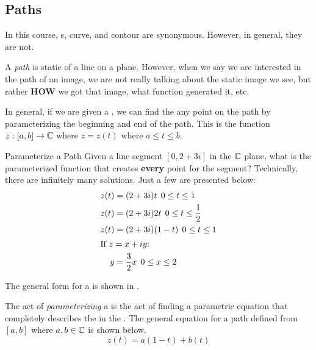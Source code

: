 \subsection{Paths}\label{subsec:Paths}
In this course, s, curve, and contour are synonymous.
However, in general, they are not.

\begin{definition}[Path]\label{def:Path}
  A \emph{path} is static  of a line on a plane.
  However, when we say we are interested in the path of an image, we are not really talking about the static image we see, but rather \textbf{HOW} we got that image, what function generated it, etc.
\end{definition}

In general, if we are given a , we can find the any point on the path by parameterizing the beginning and end of the path.
This is the function $z: [a, b] \to \operatorname{\mathbb{C}}$ where $z = z(t)$ where $a \leq t \leq b$.

\begin{example}{Parameterize a Path}
  Given a line segment $[0, 2+3i]$ in the $\operatorname{\mathbb{C}}$ plane, what is the parameterized function that creates \textbf{every} point for the segment?
  \tcblower{}
  Technically, there are infinitely many solutions.
  Just a few are presented below:
  \begin{align*}
    z(t) &= (2 + 3i)t \:\: 0 \leq t \leq 1 \\
    z(t) &= (2 + 3i)2t \:\: 0 \leq t \leq \frac{1}{2} \\
    z(t) &= (2 + 3i)(1-t) \:\: 0 \leq t \leq 1 \\
    \shortintertext{If $z = x + iy$:}
    y &= \frac{3}{2} x \:\: 0 \leq x \leq 2
  \end{align*}
\end{example}

The general form for  a  is shown in .

\begin{definition}[Parameterizing]\label{def:Parameterizing_Path}
  The act of \emph{parameterizing} a  is the act of finding a parametric equation that completely describes the  in the .
  The general equation for a path defined from $[a, b]$ where $a, b \in \operatorname{\mathbb{C}}$ is shown below.
  \begin{equation}\label{eq:Parameterizing_Path}
    z(t) = a(1-t) + b(t)
  \end{equation}
\end{definition}


